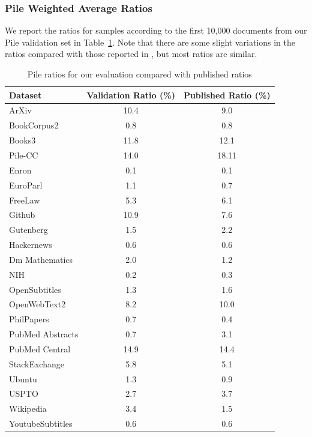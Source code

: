 \subsubsection{Pile Weighted Average Ratios}

We report the ratios for samples according to the first 10,000 documents from our Pile validation set in Table~\ref{tab:ratios}.  Note that there are some slight variations in the ratios compared with those reported in \citep{gao2020pile}, but most ratios are similar.
\begin{table}
    \centering
    \begin{tabular}{lcc}
    \toprule
       Dataset  & Validation Ratio (\%) & Published Ratio (\%) \\\hline
       ArXiv  & 10.4 & 9.0\\
       BookCorpus2 & 0.8 & 0.8\\
       Books3 & 11.8 & 12.1\\
       Pile-CC & 14.0 & 18.11\\
       Enron & 0.1 & 0.1\\
       EuroParl & 1.1 & 0.7\\
       FreeLaw & 5.3 & 6.1\\
       Github & 10.9 & 7.6\\
       Gutenberg & 1.5 & 2.2\\
       Hackernews & 0.6 & 0.6\\
       Dm Mathematics & 2.0 & 1.2\\
       NIH & 0.2 & 0.3\\
       OpenSubtitles & 1.3 & 1.6\\
       OpenWebText2 & 8.2 & 10.0\\
       PhilPapers & 0.7 & 0.4\\
       PubMed Abstracts & 0.7 & 3.1\\
       PubMed Central & 14.9 & 14.4\\
       StackExchange & 5.8 & 5.1\\
       Ubuntu & 1.3 & 0.9\\
       USPTO & 2.7 & 3.7\\
       Wikipedia & 3.4 & 1.5\\
       YoutubeSubtitles & 0.6 & 0.6\\
       \bottomrule
    \end{tabular}
    \caption{Pile ratios for our evaluation compared with published ratios}
    \label{tab:ratios}
\end{table}

